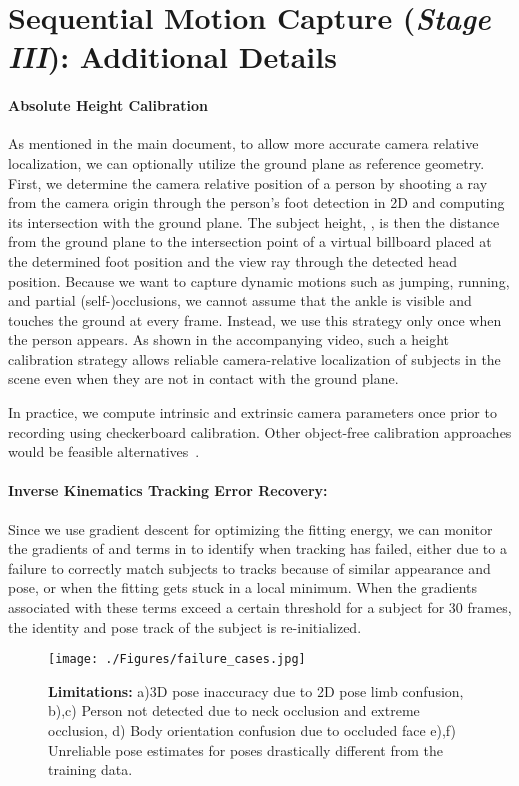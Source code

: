 \documentclass[acmtog,authorversion]{acmart}
\begin{document}
\section{Sequential Motion Capture (\textit{Stage III}): Additional Details}
\paragraph{Absolute Height Calibration}

As mentioned in the main document, to allow more accurate camera relative localization, we can optionally utilize the ground plane as reference geometry. 
First, we determine the camera relative position of a person by shooting a ray from the camera origin through the person's foot detection in 2D and computing its intersection with the ground plane. The subject height, , is then the distance from the ground plane to the intersection point of a virtual billboard placed at the determined foot position and the view ray through the detected head position.
Because we want to capture dynamic motions such as jumping, running, and partial (self-)occlusions, we cannot assume that the ankle is visible and touches the ground at every frame. Instead, we use this strategy only once when the person appears. As shown in the accompanying video, such a height calibration strategy allows reliable camera-relative localization of subjects in the scene even when they are not in contact with the ground plane.


In practice, we compute intrinsic and extrinsic camera parameters once prior to recording using checkerboard calibration. Other object-free calibration approaches would be feasible alternatives~\cite{yang2018recovering,zanfir2018monocular}.

\paragraph{Inverse Kinematics Tracking Error Recovery:}
Since we use gradient descent for optimizing the fitting energy, we can monitor the gradients of  and  terms in  to identify when tracking has failed, either due to a failure to correctly match subjects to tracks because of similar appearance and pose, or when the fitting gets stuck in a local minimum. When the gradients associated with these terms exceed a certain threshold for a subject for 30 frames, the identity and pose track of the subject is re-initialized.


\begin{figure}[h!]
  \texttt{[image: ./Figures/failure\_cases.jpg]}
  \caption{\textbf{Limitations:} a)3D pose inaccuracy due to 2D pose limb confusion, b),c) Person not detected due to neck occlusion and extreme occlusion, d) Body orientation confusion due to occluded face e),f) Unreliable pose estimates for poses drastically different from the training data.}
  \label{fig:failure_cases}
\end{figure}
\end{document}
